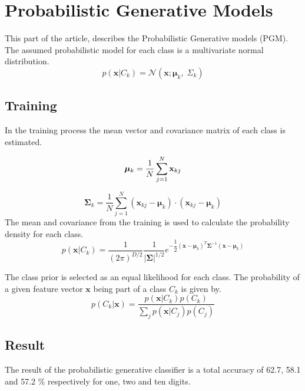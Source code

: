 \section*{Probabilistic Generative Models}
This part of the article, describes the Probabilistic Generative models (PGM).
The assumed probabilistic model for each class is a multivariate normal distribution. 
\begin{equation}
p(\mathbf{x}|C_k)=
\mathcal{N}(\mathbf{x};\mathbf{\mu}_k, \; \Sigma_k) 
\label{eq:gauss_dist} 
\end{equation}

\subsection*{Training}
In the training process the mean vector and covariance matrix of each class is estimated.

\begin{equation}
\bm{\mu}_k= \dfrac{1}{N} \sum_{j=1}^{N} \mathbf{x}_{kj} \\
\end{equation}

\begin{equation}
\bm{\Sigma}_k =
\dfrac{1}{N} 
\sum_{j=1}^{N} 
	(\mathbf{x}_{kj}-\bm{\mu}_k) 
	\cdot 
	(\mathbf{x}_{kj}-\bm{\mu}_k)
\end{equation}
The mean and covariance from the training is used to calculate the probability density for each class.
\begin{equation}
p(\mathbf{x}|C_k)=  
\dfrac{1}{(2\pi)^{D/2}} \dfrac{1}{\left|\mathbf{\Sigma} \right|^{1/2}} 
e^{
	-\dfrac{1}{2} 
	(\mathbf{x}-\bm{\mu}_k)^T 
	\bm{\Sigma}^{-1}
	(\mathbf{x}-\bm{\mu}_k) 
}
\end{equation}

The class prior is selected as an equal likelihood for each class. The probability of a given feature vector $ \mathbf{x} $ being part of a class $ C_k $ is given by.
\begin{equation}
p(C_k |\mathbf{x}) =
\dfrac{p(\mathbf{x}|C_k) p(C_k)}
{\sum_j p(\mathbf{x}|C_j) p(C_j)}
\end{equation}

\subsection*{Result}
The result of the probabilistic generative classifier is a total accuracy of 62.7, 58.1 and 57.2 \% respectively for one, two and ten digits. 